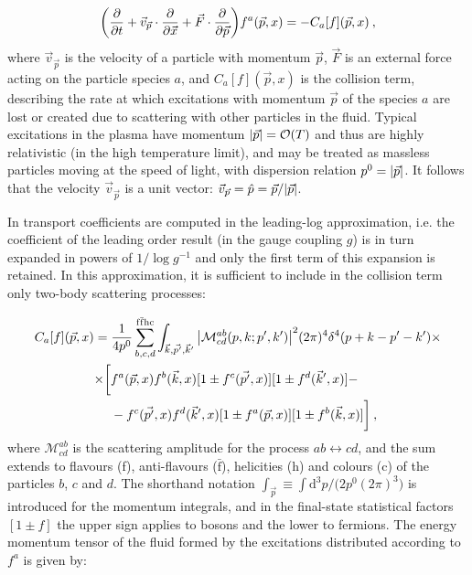 \begin{equation}
\biggl( \frac{\partial  }{\partial t}+ \vec v_{\vec p} \cdot \frac{\partial  }{\partial \vec x} + \vec F \cdot \frac{\partial  }{\partial \vec p} \biggr) f^a(\vec p,x) = -C_a[f] (\vec p,x) \: ,
\end{equation}
%
where $\vec v_{\vec p}$ is the velocity of a particle with momentum $\vec p$, $\vec F$ is an external force acting on the particle species $a$, and $C_a[f](\vec p, x)$ is the collision term, describing the rate at which excitations with momentum $\vec p$ of the species $a$ are lost or created due to scattering with other particles in the fluid. Typical excitations in the plasma have momentum $\abs{\vec p} = \mathcal O(T)$ and thus are highly relativistic (in the high temperature limit), and may be treated as massless particles moving at the speed of light, with dispersion relation $p^0= \abs{\vec p}$. It follows that the velocity $\vec v_{\vec p}$ is a unit vector: $\vec v_{\vec p} = \hat p = \vec p/ \abs{\vec p}$. 

In \cite{Arnold:2000dr} transport coefficients are computed in the leading-log approximation, i.e. the coefficient of the leading order result (in the gauge coupling $g$) is in turn expanded in powers of $1/\log{g^{-1}}$ and only the first term of this expansion is retained. In this approximation, it is sufficient to include in the collision term only two-body scattering processes:

\begin{equation}
\begin{split}
C_a[f](\vec p, x)  & = \frac{1}{4 p^0} \sum_{b,c,d}^{\mathrm{f \bar f h c}} \int_{\vec k, \vec{p'}, \vec k'} \abs{\mathcal M^{ab}_{cd}(p,k;p',k')}^2 (2 \pi)^4 \delta^4(p+k-p'-k') \times \\
& 
\begin{split}
\times  \biggl[ & f^a(\vec p,x) f^b(\vec k,x) [1 \pm f^c(\vec{p'},x)] [1 \pm f^d(\vec k',x)] - \\ 
& - f^c(\vec{p'},x) f^d(\vec k',x)[1 \pm f^a(\vec p,x)] [1 \pm f^b(\vec k,x)] \biggr]  \: ,
\end{split}
\end{split}
\end{equation}
%
where $\mathcal{M}^{ab}_{cd}$ is the scattering amplitude for the process $ab \leftrightarrow cd$, and the sum extends to flavours (f), anti-flavours ($\mathrm{\bar f}$), helicities (h) and colours (c) of the particles $b$, $c$ and $d$. The shorthand notation $\int_{\vec p} \equiv \int \mathrm{d}^3p/\bigl(2p^0 (2 \pi)^3\bigr)$ is introduced for the momentum integrals, and in the final-state statistical factors $[1 \pm f]$ the upper sign applies to bosons and the lower to fermions. 
The energy momentum tensor of the fluid formed by the excitations distributed according to $f^a$ is given by:

